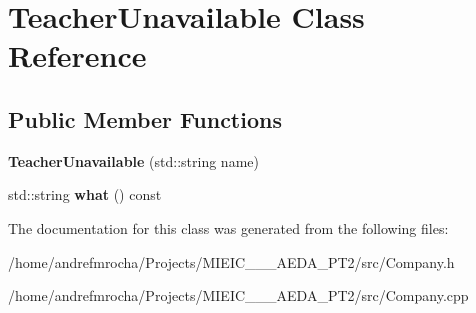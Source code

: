 \hypertarget{class_teacher_unavailable}{}\section{Teacher\+Unavailable Class Reference}
\label{class_teacher_unavailable}
\subsection*{Public Member Functions}
\begin{DoxyCompactItemize}
\item 
\mbox{\label{class_teacher_unavailable_a440954ee557d0c5838bff103b2e44538}} 
{\bfseries Teacher\+Unavailable} (std\+::string name)
\item 
\mbox{\label{class_teacher_unavailable_a532c66951ec9cb717e03f8dee7ae8199}} 
std\+::string {\bfseries what} () const
\end{DoxyCompactItemize}


The documentation for this class was generated from the following files\+:\begin{DoxyCompactItemize}
\item 
/home/andrefmrocha/\+Projects/\+M\+I\+E\+I\+C\+\_\+\_\+\_\+\+A\+E\+D\+A\+\_\+\+P\+T2/src/Company.\+h\item 
/home/andrefmrocha/\+Projects/\+M\+I\+E\+I\+C\+\_\+\_\+\_\+\+A\+E\+D\+A\+\_\+\+P\+T2/src/Company.\+cpp\end{DoxyCompactItemize}
